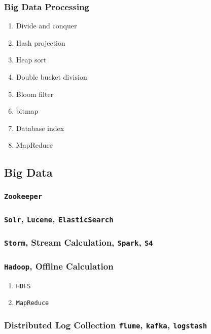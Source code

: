 \documentclass[11pt, twocolumn]{article}
\begin{document}
\subsubsection{Big Data Processing}
\begin{enumerate}
	\item Divide and conquer
	\item Hash projection
	\item Heap sort
	\item Double bucket division
	\item Bloom filter
	\item bitmap
	\item Database index
	\item MapReduce
\end{enumerate}

\subsection{Big Data}

\subsubsection{\texttt{Zookeeper}}

\subsubsection{\texttt{Solr}, \texttt{Lucene}, \texttt{ElasticSearch}}

\subsubsection{\texttt{Storm}, Stream Calculation, \texttt{Spark}, \texttt{S4}}

\subsubsection{\texttt{Hadoop}, Offline Calculation}
\begin{enumerate}
	\item \texttt{HDFS}
	\item \texttt{MapReduce}
\end{enumerate}

\subsubsection{Distributed Log Collection \texttt{flume}, \texttt{kafka}, \texttt{logstash}}
\end{document}
